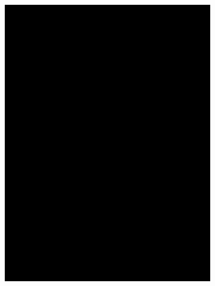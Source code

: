 \begin{figure}
	\begin{center}
		\begin{subfigure}[b]{0.3\textwidth}
			\includegraphics[width=\textwidth]{./figures/2d_grid_test.png}
		\end{subfigure}
		\begin{subfigure}[b]{0.3\textwidth}

\end{subfigure}
\end{center}
\end{figure}
